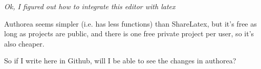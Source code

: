 \textit{Ok, I figured out how to integrate this editor with latex} 

Authorea seems simpler (i.e. has less functions) than ShareLatex, but it's free as long as projects are public, and there is one free private project per user, so it's also cheaper.

So if I write here in Github, will I be able to see the changes in authorea?
